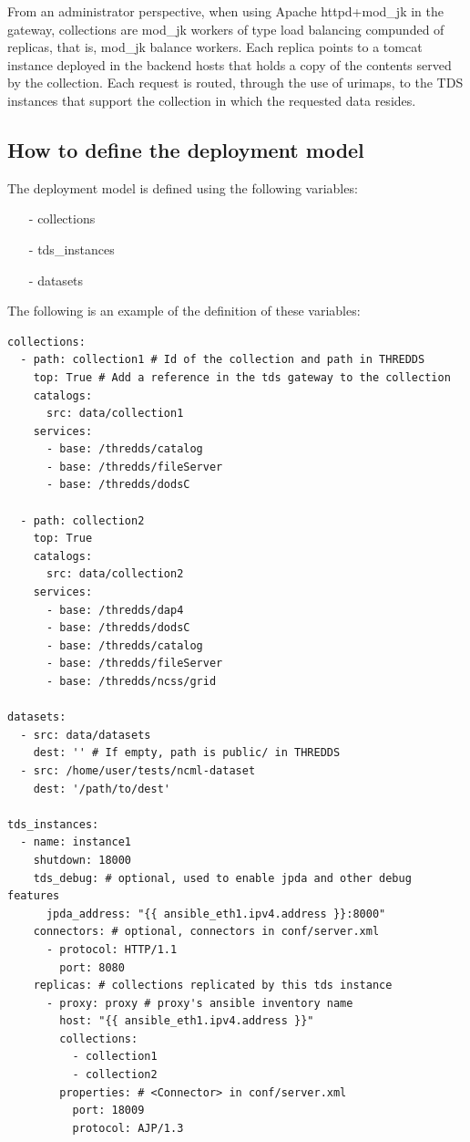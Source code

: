 \documentclass[a4paper,12pt]{article}
\begin{document}
From an administrator perspective, when using Apache httpd+mod\_jk in the gateway, collections are mod\_jk workers of type load balancing compunded of replicas, that is, mod\_jk balance workers. Each replica points to a tomcat instance deployed in the backend hosts that holds a copy of the contents served by the collection. Each request is routed, through the use of urimaps, to the TDS instances that support the collection in which the requested data resides.

\subsection{How to define the deployment model}

The deployment model is defined using the following variables:

\begin{itemize}
\item[-] collections
\item[-] tds\_instances
\item[-] datasets
\end{itemize}

The following is an example of the definition of these variables:

\begin{lstlisting}
collections:
  - path: collection1 # Id of the collection and path in THREDDS
    top: True # Add a reference in the tds gateway to the collection
    catalogs:
      src: data/collection1
    services: 
      - base: /thredds/catalog
      - base: /thredds/fileServer
      - base: /thredds/dodsC

  - path: collection2
    top: True
    catalogs:
      src: data/collection2
    services:
      - base: /thredds/dap4
      - base: /thredds/dodsC
      - base: /thredds/catalog
      - base: /thredds/fileServer
      - base: /thredds/ncss/grid

datasets:
  - src: data/datasets
    dest: '' # If empty, path is public/ in THREDDS
  - src: /home/user/tests/ncml-dataset
    dest: '/path/to/dest'

tds_instances:
  - name: instance1
    shutdown: 18000
    tds_debug: # optional, used to enable jpda and other debug features
      jpda_address: "{{ ansible_eth1.ipv4.address }}:8000"
    connectors: # optional, connectors in conf/server.xml
      - protocol: HTTP/1.1
        port: 8080
    replicas: # collections replicated by this tds instance
      - proxy: proxy # proxy's ansible inventory name 
        host: "{{ ansible_eth1.ipv4.address }}" 
        collections: 
          - collection1
          - collection2
        properties: # <Connector> in conf/server.xml
          port: 18009
          protocol: AJP/1.3
\end{lstlisting}
\end{document}
